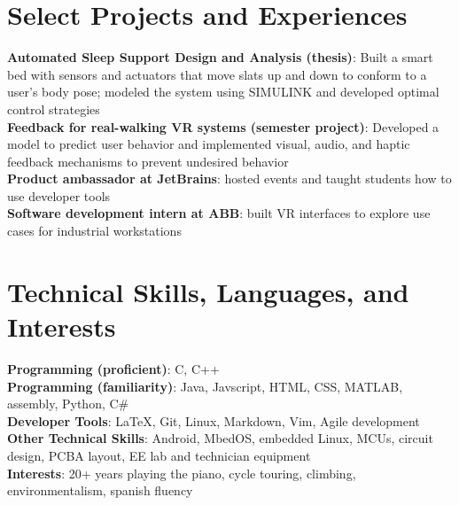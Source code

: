 \documentclass[letterpaper,10pt]{article}
\begin{document}
 \section{Select Projects and Experiences}
 \begin{itemize}[leftmargin=0.15in, rightmargin=0.5in, label={}]
    \small{\item{
    \textbf{Automated Sleep Support Design and Analysis (thesis)}{: Built a smart bed with sensors and actuators that move slats up and down to conform to a user's body pose; modeled the system using SIMULINK and developed optimal control strategies }\\
    \textbf{Feedback for real-walking VR systems (semester project)}{: Developed a model to predict user behavior and implemented visual, audio, and haptic feedback mechanisms to prevent undesired behavior}\\
    \textbf{Product ambassador at JetBrains}{: hosted events and taught students how to use developer tools}\\
    \textbf{Software development intern at ABB}{: built VR interfaces to explore use cases for industrial workstations}\\
}}
 \end{itemize}

\section{Technical Skills, Languages, and Interests}
 \begin{itemize}[leftmargin=0.15in, label={}]
    \small{\item{
    \textbf{Programming (proficient)}{: C, C++} \\
    \textbf{Programming (familiarity)}{: Java, Javscript, HTML, CSS, MATLAB, assembly, Python, C\# } \\
    \textbf{Developer Tools}{: LaTeX, Git, Linux, Markdown, Vim, Agile development}\\
    \textbf{Other Technical Skills}{: Android, MbedOS, embedded Linux, MCUs, circuit design, PCBA layout, EE lab and technician equipment }\\
    \textbf{Interests}{: 20+ years playing the piano, cycle touring, climbing, environmentalism, spanish fluency}
     
    }}
 \end{itemize}
\end{document}
